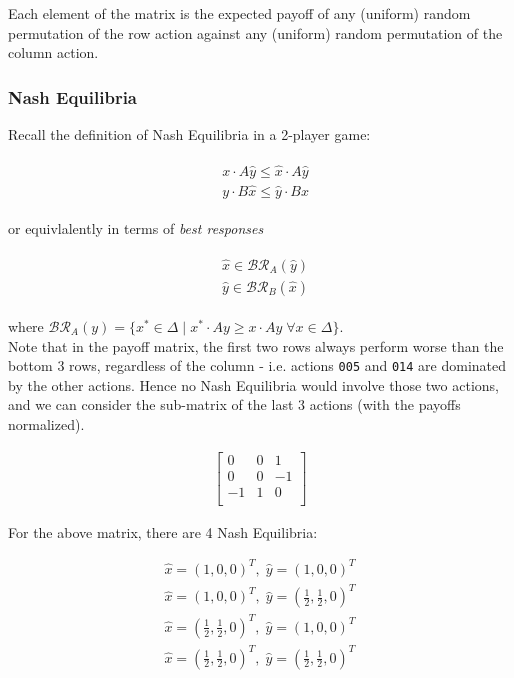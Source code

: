 \documentclass [11pt]{article}
\begin{document}
Each element of the matrix is the expected payoff of any (uniform) random permutation of the row action against any (uniform) random permutation of the column action.

\subsubsection{Nash Equilibria}

Recall the definition of Nash Equilibria in a 2-player game:

\begin{align}
  \begin{split}
    & x \cdot A \hat{y} \leq \hat{x} \cdot A \hat{y} \\
    & y \cdot B \hat{x} \leq \hat{y} \cdot B \hat{x}
  \end{split}
\end{align}

or equivlalently in terms of \textit{best responses}

\begin{align}
  \begin{split}
    & \hat{x} \in \mathcal{BR}_A( \hat{y} ) \\
    & \hat{y} \in \mathcal{BR}_B( \hat{x} )
  \end{split}
\end{align}

where $ \mathcal{BR}_A(y)  = \{ x^* \in \Delta \; | \; x^* \cdot A y \geq x \cdot A y \; \forall x \in \Delta  \} $.\\

Note that in the payoff matrix, the first two rows always perform worse than the bottom 3 rows, regardless of the column - i.e. actions \texttt{005} and \texttt{014} are dominated by the other actions. Hence no Nash Equilibria would involve those two actions, and we can consider the sub-matrix of the last 3 actions (with the payoffs normalized).

\begin{align}
  \begin{bmatrix}
    0 & 0 & 1 \\
    0 & 0 & -1 \\
    -1 & 1 & 0 \\
  \end{bmatrix}
\end{align}

For the above matrix, there are 4 Nash Equilibria:

\begin{align}
  \hat{x} = (1, 0, 0)^T, \; \hat{y} = ( 1, 0, 0 )^T \\
  \hat{x} = (1, 0, 0)^T, \; \hat{y} = (\tfrac{1}{2}, \tfrac{1}{2}, 0)^T \\
  \hat{x} = (\tfrac{1}{2}, \tfrac{1}{2}, 0)^T, \; \hat{y} = (1, 0, 0)^T \\
  \hat{x} = (\tfrac{1}{2}, \tfrac{1}{2}, 0)^T, \; \hat{y} = (\tfrac{1}{2}, \tfrac{1}{2}, 0)^T
\end{align}
\end{document}
